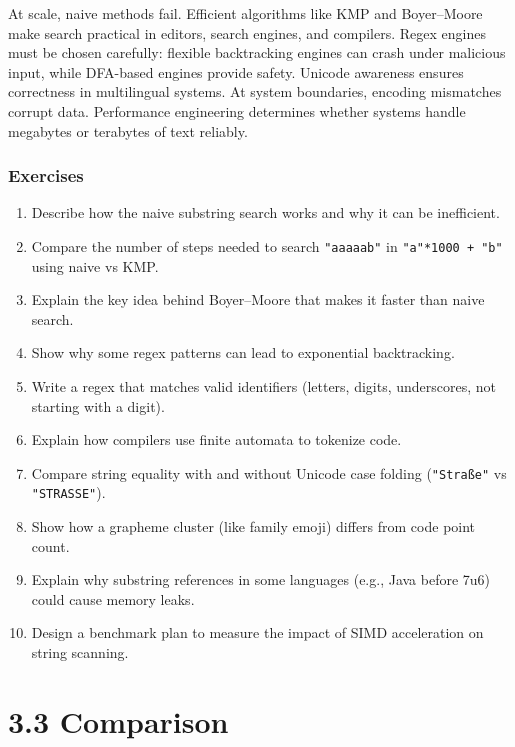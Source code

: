\documentclass[
  letterpaper,
  DIV=11,
  numbers=noendperiod]{scrreprt}
\providecommand{\tightlist}{%
  \setlength{\itemsep}{0pt}\setlength{\parskip}{0pt}}
\begin{document}
At scale, naive methods fail. Efficient algorithms like KMP and
Boyer--Moore make search practical in editors, search engines, and
compilers. Regex engines must be chosen carefully: flexible backtracking
engines can crash under malicious input, while DFA-based engines provide
safety. Unicode awareness ensures correctness in multilingual systems.
At system boundaries, encoding mismatches corrupt data. Performance
engineering determines whether systems handle megabytes or terabytes of
text reliably.

\subsubsection{Exercises}\label{exercises-34}

\begin{enumerate}
\def\labelenumi{\arabic{enumi}.}
\tightlist
\item
  Describe how the naive substring search works and why it can be
  inefficient.
\item
  Compare the number of steps needed to search \texttt{"aaaaab"} in
  \texttt{"a"*1000\ +\ "b"} using naive vs KMP.
\item
  Explain the key idea behind Boyer--Moore that makes it faster than
  naive search.
\item
  Show why some regex patterns can lead to exponential backtracking.
\item
  Write a regex that matches valid identifiers (letters, digits,
  underscores, not starting with a digit).
\item
  Explain how compilers use finite automata to tokenize code.
\item
  Compare string equality with and without Unicode case folding
  (\texttt{"Straße"} vs \texttt{"STRASSE"}).
\item
  Show how a grapheme cluster (like family emoji) differs from code
  point count.
\item
  Explain why substring references in some languages (e.g., Java before
  7u6) could cause memory leaks.
\item
  Design a benchmark plan to measure the impact of SIMD acceleration on
  string scanning.
\end{enumerate}

\section{3.3 Comparison}\label{comparison}
\end{document}
